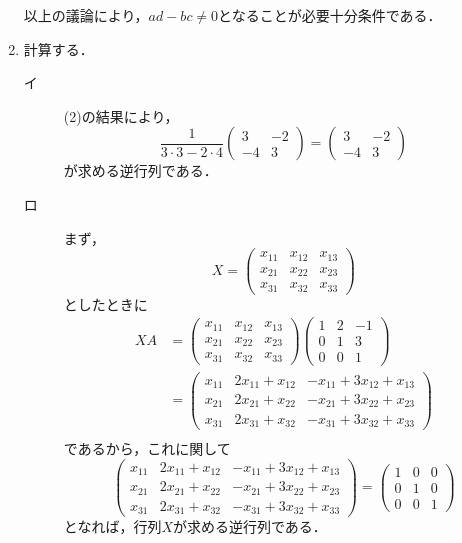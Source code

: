 \documentclass[uplatex,dvipdfmx,a4paper,10pt,fleqn]{jsarticle}
\begin{document}
\begin{leftbar}
\begin{enumerate}
        以上の議論により，$ad - bc \ne 0$となることが必要十分条件である．
        \item 計算する．
    \begin{description}
        \item[イ] (2)の結果により，
        \[
            \frac{1}{3 \cdot 3 - 2 \cdot 4} \begin{pmatrix} 3 & -2 \\ -4 & 3 \end{pmatrix} =  \begin{pmatrix} 3 & -2 \\ -4 & 3 \end{pmatrix}
        \]
        が求める逆行列である．
        \item[ロ] まず，
        \[
            X= \begin{pmatrix} x_{11} & x_{12} & x_{13} \\x_{21} & x_{22} & x_{23} \\x_{31} & x_{32} & x_{33}  \end{pmatrix}
        \]
        としたときに
        \begin{align*} 
           XA &=  \begin{pmatrix} x_{11} & x_{12} & x_{13} \\x_{21} & x_{22} & x_{23} \\x_{31} & x_{32} & x_{33}  \end{pmatrix}
            \begin{pmatrix} 1 & 2 & -1 \\ 0& 1 & 3 \\ 0 & 0 & 1 \end{pmatrix}  \\
            & = \begin{pmatrix} x_{11} & 2x_{11} + x_{12} & -x_{11} +3x_{12} +x_{13} \\ x_{21} & 2x_{21} + x_{22} & -x_{21} +3x_{22} +x_{23} \\  x_{31} & 2x_{31} + x_{32} & -x_{31} +3x_{32} +x_{33} \end{pmatrix} \\
        \end{align*} 
        であるから，これに関して
        \[
            \begin{pmatrix} x_{11} & 2x_{11} + x_{12} & -x_{11} +3x_{12} +x_{13} \\ x_{21} & 2x_{21} + x_{22} & -x_{21} +3x_{22} +x_{23} \\  x_{31} & 2x_{31} + x_{32} & -x_{31} +3x_{32} +x_{33} \end{pmatrix} = \begin{pmatrix} 1 & 0 & 0 \\ 0 & 1 & 0 \\ 0 & 0 & 1 \end{pmatrix}
        \]
        となれば，行列$X$が求める逆行列である．


\end{description}
\end{enumerate}
\end{leftbar}
\end{document}
